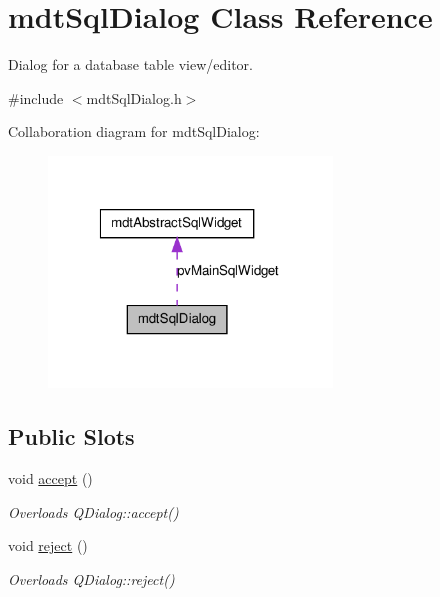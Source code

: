 \hypertarget{classmdt_sql_dialog}{
\section{mdtSqlDialog Class Reference}
\label{classmdt_sql_dialog}
}


Dialog for a database table view/editor.  




{\ttfamily \#include $<$mdtSqlDialog.h$>$}



Collaboration diagram for mdtSqlDialog:\nopagebreak
\begin{figure}[H]
\begin{center}
\leavevmode
\includegraphics[width=214pt]{classmdt_sql_dialog__coll__graph}
\end{center}
\end{figure}
\subsection*{Public Slots}
\begin{DoxyCompactItemize}
\item 
\hypertarget{classmdt_sql_dialog_affba1732b5f32db150d0e700ecc339f8}{
void \hyperlink{classmdt_sql_dialog_affba1732b5f32db150d0e700ecc339f8}{accept} ()}
\label{classmdt_sql_dialog_affba1732b5f32db150d0e700ecc339f8}

\begin{DoxyCompactList}\small\item\em Overloads QDialog::accept() \end{DoxyCompactList}\item 
\hypertarget{classmdt_sql_dialog_ada1726d5861cb071fab7a1c31bc52abb}{
void \hyperlink{classmdt_sql_dialog_ada1726d5861cb071fab7a1c31bc52abb}{reject} ()}
\label{classmdt_sql_dialog_ada1726d5861cb071fab7a1c31bc52abb}

\begin{DoxyCompactList}\small\item\em Overloads QDialog::reject() \end{DoxyCompactList}\end{DoxyCompactItemize}
